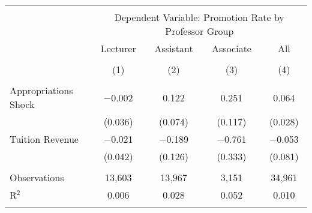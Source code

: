 
\begin{tabular}{@{\extracolsep{5pt}}lcccc} 
\\[-1.8ex]\hline 
\hline \\[-1.8ex] 
 & \multicolumn{4}{c}{Dependent Variable: Promotion Rate by Professor Group} \\ 
\cline{2-5} 
 & Lecturer & Assistant & Associate & All \\ 
\\[-1.8ex] & (1) & (2) & (3) & (4)\\ 
\hline \\[-1.8ex] 
 Appropriations Shock & $-$0.002 & 0.122 & 0.251 & 0.064 \\ 
  & (0.036) & (0.074) & (0.117) & (0.028) \\ 
  Tuition Revenue & $-$0.021 & $-$0.189 & $-$0.761 & $-$0.053 \\ 
  & (0.042) & (0.126) & (0.333) & (0.081) \\ 
 \hline \\[-1.8ex] 
Observations & 13,603 & 13,967 & 3,151 & 34,961 \\ 
R$^{2}$ & 0.006 & 0.028 & 0.052 & 0.010 \\ 
\hline 
\hline \\[-1.8ex] 
\end{tabular} 
